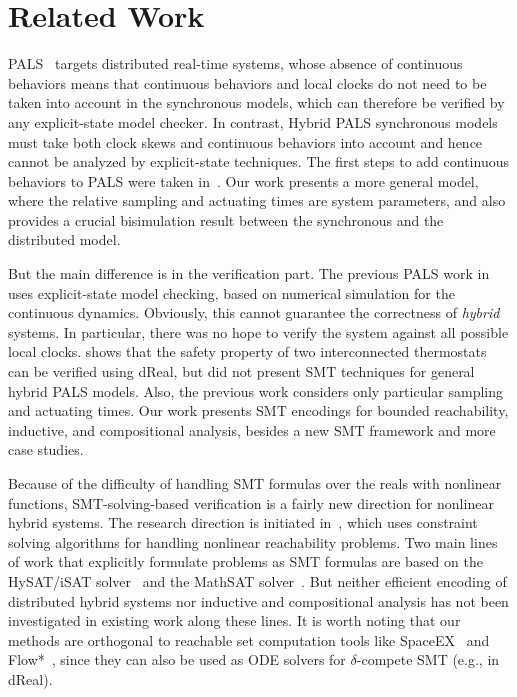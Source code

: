 

\section{Related Work}
\label{sec:related-work}

PALS~\cite{pals-rtss09,mr-pals-journal,pals-tcs,al2012pattern} targets
distributed real-time systems, whose absence of continuous behaviors
means that continuous behaviors and local clocks do not need to be
taken into account in the synchronous models, which can therefore be
verified by any explicit-state model checker. In contrast, Hybrid PALS
synchronous models must take both clock skews and continuous behaviors
into account and hence cannot be analyzed by explicit-state
techniques. The first steps to add continuous behaviors to PALS were
taken in~\cite{hybrid-pals}. Our work presents a more general
model, where the relative sampling and actuating times are system
parameters,  and also provides a crucial bisimulation result between
the 
synchronous and the distributed model. 

But the main difference is in the verification part. 
The previous PALS work in \cite{mr-pals-journal,ftscs-journal} uses explicit-state model checking, 
based on numerical simulation for the continuous dynamics.
Obviously, this cannot guarantee the correctness of \emph{hybrid} systems.
In particular,
there was no hope to verify the system against all possible local clocks.
\cite{hybrid-pals} shows that the safety property of two interconnected thermostats
can be verified using \textsf{dReal}, but did not present SMT techniques for 
general hybrid PALS models.
Also, the previous work considers only particular sampling and actuating times.
Our work presents SMT encodings for bounded reachability, inductive, and
compositional analysis, %
besides a new SMT framework and more case studies.

Because of the difficulty of handling SMT
formulas over the reals with nonlinear functions, 
SMT-solving-based verification is a fairly new direction for nonlinear hybrid
systems. The research
direction is initiated in~\cite{ratschan2007safety}, which uses constraint
solving algorithms for handling nonlinear reachability problems. Two
main lines of work that explicitly formulate problems as SMT formulas
are based on the HySAT/iSAT
solver~\cite{DBLP:journals/fmsd/FranzleH07,eggers2008sat}
and the MathSAT
solver~\cite{DBLP:conf/aaai/CimattiMT12,DBLP:conf/fmcad/CimattiMT12}.
But neither efficient encoding of distributed hybrid systems nor 
inductive and compositional analysis has not been
investigated in existing work along these lines. 
%
It is worth noting that 
our methods are orthogonal to reachable set computation tools like SpaceEX~\cite{DBLP:conf/cav/FrehseGDCRLRGDM11}
and Flow*~\cite{DBLP:conf/cav/ChenAS13},
since they can also be used as ODE solvers for $\delta$-compete SMT (e.g., in \textsf{dReal}).

